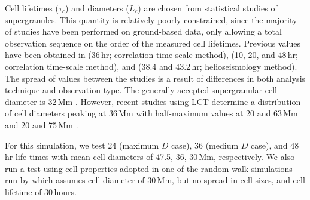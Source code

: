 Cell lifetimes ($\tau_c$) and diameters ($L_c$) are chosen from statistical studies of supergranules. This quantity is relatively poorly constrained, since the majority of studies have been performed on ground-based data, only allowing a total observation sequence on the order of the measured cell lifetimes. Previous values have been obtained in \cite{Worden:1976} (36\,hr; correlation time-scale method), \cite{Wang:1989b} (10, 20, and 48\,hr; correlation time-scale method), and \cite{Hirzberger:2008} (38.4 and 43.2\,hr; helioseismology method). The spread of values between the studies is a result of differences in both analysis technique and observation type. 
 The generally accepted supergranular cell diameter is 32\,Mm \citep{Leighton:1962}.  %
 However, recent studies using \gls{LCT} determine a distribution of cell diameters peaking at 36\,Mm with half-maximum values at 20 and 63\,Mm \citep{Hathaway:2000,Hathaway:2002} and 20 and 75\,Mm \citep{Rieutord:2008}.

\begin{table}[!t]
\caption[A summary of random-walk simulation runs.]{A summary of random-walk simulation runs. The mean supergranular cell diameter ($L_c$) and lifetime ($\tau_c$) for each run is given. The results of determining $D$ by fitting time series of particle $\langle R^2 \rangle$ and spatial distribution HWHM are given in the last two columns.}\label{table:simrandwalk}
\end{table}

For this simulation, we test 24 (maximum $D$ case), 36 (medium $D$ case), and 48\,hr life times with mean cell diameters of 47.5, 36, 30\,Mm, respectively. We also run a test using cell properties adopted in one of the random-walk simulations run by \citet{Simon:1995} which assumes cell diameter of 30\,Mm, but no spread in cell sizes, and cell lifetime of 30\,hours. 

